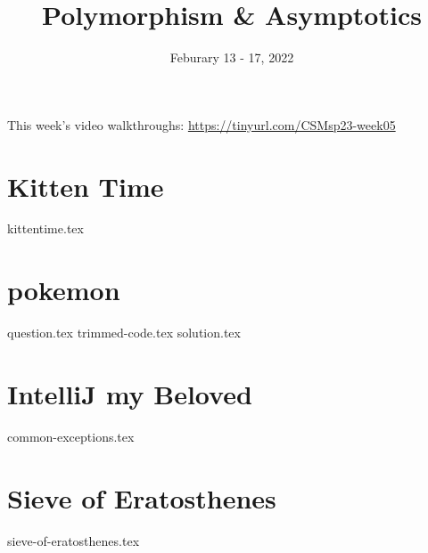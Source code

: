 \documentclass[11pt]{exam}
\title{Polymorphism \& Asymptotics}
\date{Feburary 13 - 17, 2022}
\begin{document}
\maketitle
This week's video walkthroughs:
\href{https://tinyurl.com/CSMsp23-week05}{https://tinyurl.com/CSMsp23-week05}


\section{Kitten Time}
\begin{questions}
{kittentime.tex}
\end{questions}

\pagebreak
\section{pokemon}
\begin{questions}
{question.tex}
{trimmed-code.tex}
{solution.tex}
\end{questions}


\pagebreak
\section{IntelliJ my Beloved}
\begin{questions}
{common-exceptions.tex}
\end{questions}


\section{Sieve of Eratosthenes}
\begin{questions}
{sieve-of-eratosthenes.tex}
\end{questions}
\end{document}
